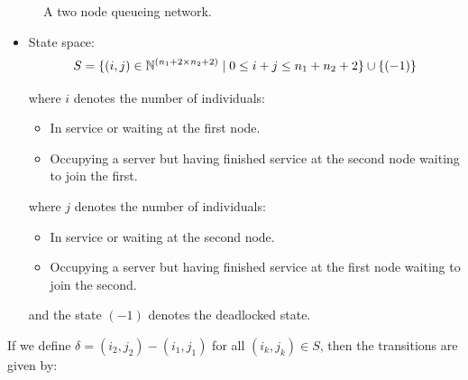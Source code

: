 \documentclass{article}
\begin{document}
\begin{figure}[!htbp]
  
  \caption{A two node queueing network.}
  \label{fig:queueingnetwork_2nodes}
\end{figure}

\begin{itemize}
    \item State space:
        \[S = \{(i,j)\in\mathbb{N}^{(n_1+2\times n_2+2)} \nonscript\; | \nonscript\; 0 \leq i + j \leq n_1 + n_2 + 2
        \}\cup\{(-1)\}\]

        where \(i\) denotes the number of individuals:
            \begin{itemize}
                \item In service or waiting at the first node.
                \item Occupying a server but having finished service at the
                    second node waiting to join the first.
            \end{itemize}
        where \(j\) denotes the number of individuals:
            \begin{itemize}
                \item In service or waiting at the second node.
                \item Occupying a server but having finished service at the
                    first node waiting to join the second.
            \end{itemize}
        and the state $(-1)$ denotes the deadlocked state.
\end{itemize}

If we define $\delta = (i_2, j_2) - (i_1, j_1)$ for all $(i_k, j_k) \in S$, then the transitions are given by:
\end{document}
